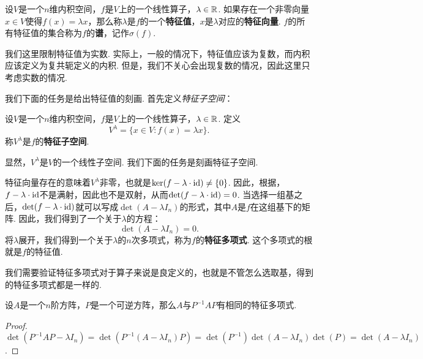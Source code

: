 \begin{definition}
设$V$是一个$n$维内积空间，$f$是$V$上的一个线性算子，$\lambda\in\mathbb{R}$. 如果存在一个非零向量$x\in V$使得$f(x)=\lambda x$，那么称$\lambda$是$f$的一个\textbf{特征值}，$x$是$\lambda$对应的\textbf{特征向量}. $f$的所有特征值的集合称为$f$的\textbf{谱}，记作$\sigma(f)$. 
\end{definition}

我们这里限制特征值为实数. 实际上，一般的情况下，特征值应该为复数，而内积应该定义为复共轭定义的内积. 但是，我们不关心会出现复数的情况，因此这里只考虑实数的情况. 

我们下面的任务是给出特征值的刻画. 首先定义\emph{特征子空间}：

\begin{definition}[特征子空间]
设$V$是一个$n$维内积空间，$f$是$V$上的一个线性算子，$\lambda\in\mathbb{R}$. 定义
\[V^\lambda=\{x\in V:f(x)=\lambda x\}.\]
称$V^\lambda$是$f$的\textbf{特征子空间}. 
\end{definition}

显然，$V^\lambda$是$V$的一个线性子空间. 我们下面的任务是刻画特征子空间. 

特征向量存在的意味着$V^\lambda$非零，也就是$\ker(f-\lambda\cdot \mathrm{id})\neq\{0\}$. 因此，根据，$f-\lambda\cdot \mathrm{id}$不是满射，因此也不是双射，从而$\det(f-\lambda\cdot \mathrm{id})=0$. 当选择一组基之后，$\det(f-\lambda\cdot \mathrm{id})$就可以写成$\det(A-\lambda I_n)$的形式，其中$A$是$f$在这组基下的矩阵. 因此，我们得到了一个关于$\lambda$的方程：
\begin{equation}\label{eq:characteristic-equation}
    \det(A-\lambda I_n)=0.
\end{equation}
将$\lambda$展开，我们得到一个关于$\lambda$的$n$次多项式，称为$f$的\textbf{特征多项式}. 这个多项式的根就是$f$的特征值. 

我们需要验证特征多项式对于算子来说是良定义的，也就是不管怎么选取基，得到的特征多项式都是一样的.

\begin{proposition}\label{prop:similar-matrix-same-characteristic-polynomial}
    设$A$是一个$n$阶方阵，$P$是一个可逆方阵，那么$A$与$P^{-1}AP$有相同的特征多项式. 
\end{proposition}
\begin{proof}
    $\det(P^{-1}AP-\lambda I_n)=\det(P^{-1}(A-\lambda I_n)P)=\det(P^{-1})\det(A-\lambda I_n)\det(P)=\det(A-\lambda I_n)$.
\end{proof}

